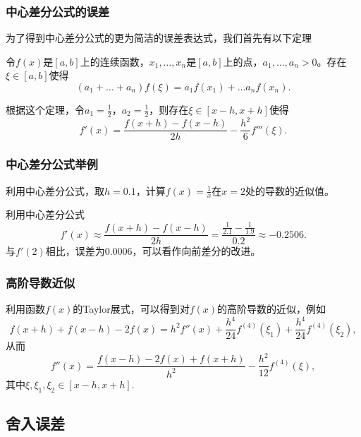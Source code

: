 \documentclass[10pt]{beamer}
\begin{document}
\begin{frame}
\frametitle{中心差分公式的误差}
为了得到中心差分公式的更为简洁的误差表达式，我们首先有以下定理
\begin{theorem}[中值定理的一般形式]
令$f(x)$是$[a,b]$上的连续函数，$x_1, \ldots, x_n$是$[a,b]$上的点，$a_1, \ldots, a_n >0$。存在$\xi \in [a,b]$使得
\begin{equation}
(a_1 + \ldots + a_n) f(\xi) = a_1 f(x_1) + \ldots a_n f(x_n).
\end{equation}
\end{theorem}
根据这个定理，令$a_1 = \frac{1}{2}$，$a_2 = \frac{1}{2}$，则存在$\xi \in [x - h, x+h]$使得
\begin{equation}
f'(x) = \frac{f(x+h) - f(x-h)}{2h} - \frac{h^2}{6} f'''(\xi).
\end{equation}
\end{frame}


\begin{frame}
\frametitle{中心差分公式举例}
\begin{example}
利用中心差分公式，取$h = 0.1$，计算$f(x) = \frac{1}{x}$在$x = 2$处的导数的近似值。
\end{example}
利用中心差分公式
\begin{equation}
f'(x) \approx \frac{f(x+h) - f(x-h)}{2h} = \frac{\frac{1}{2.1} - \frac{1}{1.9}}{0.2} \approx -0.2506.
\end{equation}
与$f'(2)$相比，误差为$0.0006$，可以看作向前差分的改进。
\end{frame}


\begin{frame}
\frametitle{高阶导数近似}
利用函数$f(x)$的Taylor展式，可以得到对$f(x)$的高阶导数的近似，例如
\begin{equation}
f(x+h) + f(x-h) - 2f(x) = h^2 f''(x) + \frac{h^4}{24} f^{(4)}(\xi_1) + \frac{h^4}{24} f^{(4)}(\xi_2),
\end{equation}
从而
\begin{equation}
f''(x) = \frac{f(x-h) - 2f(x) + f(x+h)}{h^2} - \frac{h^2}{12} f^{(4)}(\xi),
\end{equation}
其中$\xi, \xi_1, \xi_2 \in [x-h, x+h]$.
\end{frame}


\subsection{舍入误差}
\end{document}
